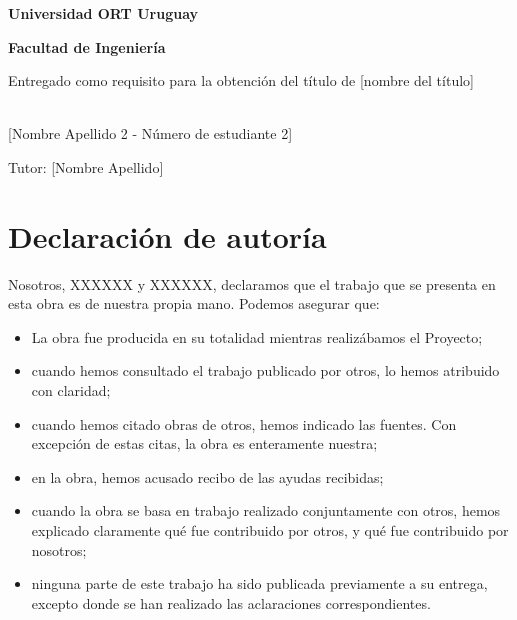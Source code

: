 \documentclass[12pt,a4paper,oneside]{book}
\begin{document}
\vspace*{\fill}

\begin{center}

\begin{Large}
\textbf{Universidad ORT Uruguay}

\textbf{Facultad de Ingeniería}
\vspace{5cm}
\end{Large}

\begin{huge}
\end{huge} 

\vspace{1cm}

Entregado como requisito para la obtención del título de [nombre del título]
\vspace{2cm}

\begin{Large}
\\

[Nombre Apellido 2 - Número de estudiante 2]
\vspace{2cm}

Tutor: [Nombre Apellido]
\vspace{2cm}
\end{Large}

\begin{large}
\end{large}

\end{center}
\vspace*{\fill}

\thispagestyle{empty}
\newpage




\chapter*{Declaración de autoría}




Nosotros, XXXXXX y XXXXXX, declaramos que el trabajo que se presenta en esta obra es de nuestra
propia mano. Podemos asegurar que:
\begin{itemize}
\item La obra fue producida en su totalidad mientras realizábamos el Proyecto;
\item cuando hemos consultado el trabajo publicado por otros, lo hemos atribuido con claridad;
\item cuando hemos citado obras de otros, hemos indicado las fuentes. Con excepción de estas citas, la obra es enteramente nuestra;
\item en la obra, hemos acusado recibo de las ayudas recibidas;
\item cuando la obra se basa en trabajo realizado conjuntamente con otros, hemos explicado claramente qué fue contribuido por otros, y qué fue contribuido por nosotros;
\item ninguna parte de este trabajo ha sido publicada previamente a su entrega, excepto donde se han realizado las aclaraciones correspondientes.
\end{itemize}
\end{document}

